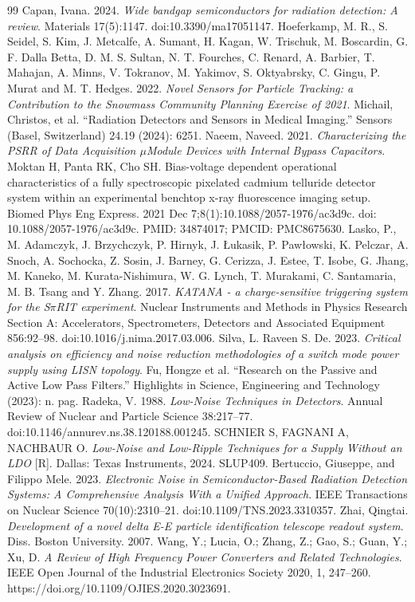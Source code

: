 \documentclass[12pt,fontset=fandol]{ctexart}
\begin{document}
\begin{thebibliography}{99}
 Capan, Ivana. 2024. \textit{Wide bandgap semiconductors for radiation detection: A review}. Materials 17(5):1147. doi:10.3390/ma17051147.
 Hoeferkamp, M. R., S. Seidel, S. Kim, J. Metcalfe, A. Sumant, H. Kagan, W. Trischuk, M. Boscardin, G. F. Dalla Betta, D. M. S. Sultan, N. T. Fourches, C. Renard, A. Barbier, T. Mahajan, A. Minns, V. Tokranov, M. Yakimov, S. Oktyabrsky, C. Gingu, P. Murat and M. T. Hedges. 2022. \textit{Novel Sensors for Particle Tracking: a Contribution to the Snowmass Community Planning Exercise of 2021}.
 Michail, Christos, et al. ``Radiation Detectors and Sensors in Medical Imaging.'' Sensors (Basel, Switzerland) 24.19 (2024): 6251.
 Naeem, Naveed. 2021. \textit{Characterizing the PSRR of Data Acquisition $\mu$Module Devices with Internal Bypass Capacitors}.
 Moktan H, Panta RK, Cho SH. Bias-voltage dependent operational characteristics of a fully spectroscopic pixelated cadmium telluride detector system within an experimental benchtop x-ray fluorescence imaging setup. Biomed Phys Eng Express. 2021 Dec 7;8(1):10.1088/2057-1976/ac3d9c. doi: 10.1088/2057-1976/ac3d9c. PMID: 34874017; PMCID: PMC8675630.
 Lasko, P., M. Adamczyk, J. Brzychczyk, P. Hirnyk, J. \L ukasik, P. Paw\l owski, K. Pelczar, A. Snoch, A. Sochocka, Z. Sosin, J. Barney, G. Cerizza, J. Estee, T. Isobe, G. Jhang, M. Kaneko, M. Kurata-Nishimura, W. G. Lynch, T. Murakami, C. Santamaria, M. B. Tsang and Y. Zhang. 2017. \textit{KATANA - a charge-sensitive triggering system for the S$\pi$RIT experiment}. Nuclear Instruments and Methods in Physics Research Section A: Accelerators, Spectrometers, Detectors and Associated Equipment 856:92--98. doi:10.1016/j.nima.2017.03.006.
 Silva, L. Raveen S. De. 2023. \textit{Critical analysis on efficiency and noise reduction methodologies of a switch mode power supply using LISN topology}.
 Fu, Hongze et al. ``Research on the Passive and Active Low Pass Filters.'' Highlights in Science, Engineering and Technology (2023): n. pag.
 Radeka, V. 1988. \textit{Low-Noise Techniques in Detectors}. Annual Review of Nuclear and Particle Science 38:217--77. doi:10.1146/annurev.ns.38.120188.001245.
 SCHNIER S, FAGNANI A, NACHBAUR O. \textit{Low-Noise and Low-Ripple Techniques for a Supply Without an LDO} [R]. Dallas: Texas Instruments, 2024. SLUP409.
 Bertuccio, Giuseppe, and Filippo Mele. 2023. \textit{Electronic Noise in Semiconductor-Based Radiation Detection Systems: A Comprehensive Analysis With a Unified Approach}. IEEE Transactions on Nuclear Science 70(10):2310--21. doi:10.1109/TNS.2023.3310357.
 Zhai, Qingtai. \textit{Development of a novel delta E-E particle identification telescope readout system}. Diss. Boston University. 2007.
 Wang, Y.; Lucia, O.; Zhang, Z.; Gao, S.; Guan, Y.; Xu, D. \textit{A Review of High Frequency Power Converters and Related Technologies}. IEEE Open Journal of the Industrial Electronics Society 2020, 1, 247--260. https://doi.org/10.1109/OJIES.2020.3023691.
\end{thebibliography}
\end{document}
